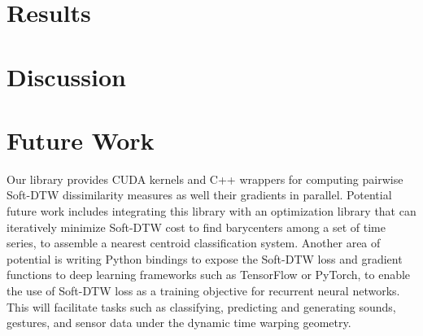 \documentclass[12pt, letterpaper]{article}
\begin{document}
\section{Results}


\section{Discussion}

\section{Future Work}

Our library provides CUDA kernels and C++ wrappers for computing pairwise
Soft-DTW dissimilarity measures as well their gradients in parallel. Potential
future work includes integrating this library with an optimization library that
can iteratively minimize Soft-DTW cost to find barycenters among a set of time
series, to assemble a nearest centroid classification system. Another area of
potential is writing Python bindings to expose the Soft-DTW loss and gradient
functions to deep learning frameworks such as TensorFlow or PyTorch, to enable
the use of Soft-DTW loss as a training objective for recurrent neural networks.
This will facilitate tasks such as classifying, predicting and generating sounds,
gestures, and sensor data under the dynamic time warping geometry.

\printbibliography[]
\end{document}
